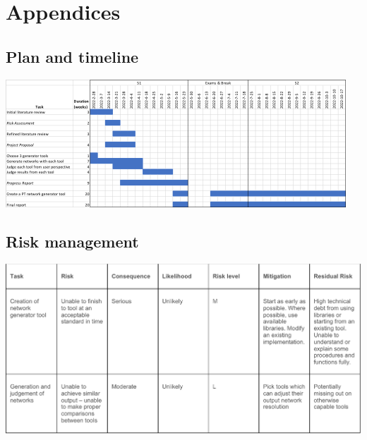\documentclass[11pt]{article}
\begin{document}
\section{Appendices}
\label{sec:orge54866b}
\subsection{Plan and timeline}
\label{sec:orgc7ac705}
\label{app:A}

\begin{center}
\includegraphics[width=.9\linewidth]{./img/timeline.png}
\end{center}
\subsection{Risk management}
\label{sec:org02e56c3}
\label{app:B}

\begin{center}
\includegraphics[width=.9\linewidth]{./img/risk.png}
\end{center}
\end{document}
